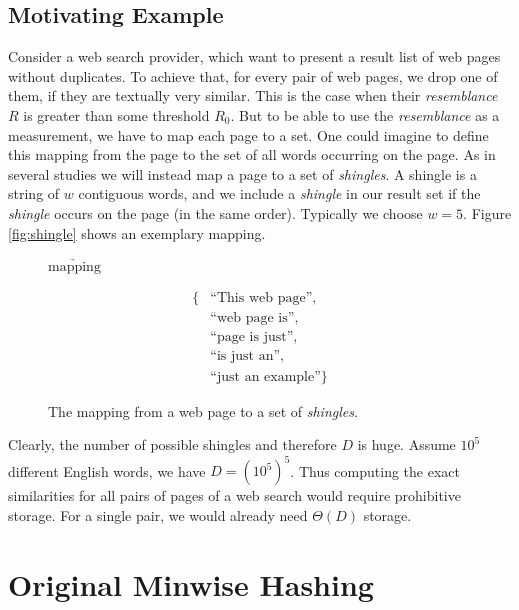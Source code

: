 \documentclass[a4paper]{article}
\begin{document}
\subsection{Motivating Example}
Consider a web search provider, which want to present a result list of web pages without duplicates. To achieve that, for every pair of web pages, we drop one of them, if they are textually very similar. This is the case when their \emph{resemblance} $R$ is greater than some threshold $R_0$. But to be able to use the \emph{resemblance} as a measurement, we have to map each page to a set. One could imagine to define this mapping from the page to the set of all words occurring on the page. As in several studies \citep{Broder:1998,BroderGMZ97} we will instead map a page to a set of \emph{shingles}. A shingle is a string of $w$ contiguous words, and we include a \emph{shingle} in our result set if the \emph{shingle} occurs on the page (in the same order). Typically we choose $w = 5$. Figure \vref{fig:shingle} shows an exemplary mapping.

\begin{figure}[H]
\begin{center}
\hspace{1cm} $\underrightarrow{\text{mapping}}$ \hspace{1cm}
\parbox{2cm}{
\begin{equation*}
\begin{split}
 \text{\{} & \text{``This web page''},\\ & \text{``web page is''},\\ & \text{``page is just''},\\ & \text{``is just an''},\\ & \text{``just an example''} \text{\}}
\end{split}
\end{equation*}
}
\end{center}
\caption{The mapping from a web page to a set of \emph{shingles}.}
\label{fig:shingle}
\end{figure}

Clearly, the number of possible shingles and therefore $D$ is huge. Assume $10^5$ different English words, we have $D=\left(10^5\right)^5$. Thus computing the exact similarities for all pairs of pages of a web search would require prohibitive storage. For a single pair, we would already need $\Theta(D)$ storage.

\section{Original Minwise Hashing}
\end{document}
